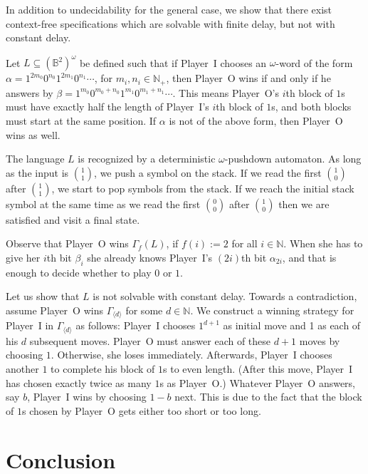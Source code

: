 \documentclass[fleqn,envcountsame]{LMCS}
\newcommand{\pI}{Player~I\xspace}
\newcommand{\pO}{Player~O\xspace}
\newcommand{\Gd}[1]{\ensuremath{\Gamma_{#1}}\xspace}
\newcommand{\GdL}[1]{\ensuremath{\Gamma_{#1}(L)}\xspace}
\newcommand{\const}[1]{\ensuremath{\langle#1\rangle}\xspace}
\newcommand{\Nat}{\ensuremath{\mathbb{N}}\xspace}
\newcommand{\Natp}{\ensuremath{\mathbb{N}_+}\xspace}
\newcommand{\Bsqom}{\ensuremath{(\mathbb{B}^2)^{\omega}}\xspace}
\newcommand{\al}{\ensuremath{\alpha}\xspace}
\newcommand{\be}{\ensuremath{\beta}\xspace}
\let\obinom\binom
\renewcommand\binom[2]{
  \Big( { {{#1}} \atop {{#2}} } \Big)
}
\begin{document}
In addition to undecidability for the general case, we show that there exist
context-free specifications which are solvable with finite delay,
but not with constant delay.

\begin{exa}\label{ex:non_regular_not_constant_delay}
Let $L\subseteq\Bsqom$ be defined such that if \pI chooses an $\omega$-word
of the form $\al=1^{2m_0}0^{n_0}1^{2m_1}0^{n_1}\cdots$, for $m_i,n_i\in\Natp$, then
\pO wins if and only if he answers by $\beta=1^{m_0}0^{m_0+n_0}1^{m_1}0^{m_1+n_1}\cdots$.
This means \pO's $i$th block of $1$s must have exactly half the length of
\pI's $i$th block of $1$s, and both blocks must start at the same position.
If \al is not of the above form, then \pO wins as well.

The language $L$ is recognized by a deterministic $\omega$-pushdown automaton.
As long as the input is $\obinom{1}{1}$, we push a symbol on the stack.
If we read the first $\obinom{1}{0}$ after $\obinom{1}{1}$,
we start to pop symbols from the stack. If we reach the initial stack
symbol at the same time as we read the first $\obinom{0}{0}$
after $\obinom{1}{0}$ then we are satisfied and visit a final state.

Observe that \pO wins \GdL{f}, if $f(i):=2$ for all $i\in\Nat$.
When she has to give her $i$th bit $\be_i$ she already knows \pI's $(2i)$th bit $\al_{2i}$,
and that is enough to decide whether to play $0$ or $1$.

Let us show that $L$ is not solvable with constant delay.
Towards a contradiction, assume \pO wins \Gd{\const{d}} for some $d\in\Nat$.
We construct a winning strategy for \pI in \Gd{\const{d}} as follows:
\pI chooses $1^{d+1}$ as initial move and 1 as each of his $d$ subsequent moves.
\pO must answer each of these $d+1$ moves by choosing $1$. Otherwise, she loses immediately.
Afterwards, \pI chooses another $1$ to complete his block of $1$s to even length.
(After this move, \pI has chosen exactly twice as many $1$s as \pO.)
Whatever \pO answers, say $b$, \pI wins by choosing $1-b$ next.
This is due to the fact that the block of $1$s chosen by \pO gets either
too short or too long. 
\end{exa}



\section{Conclusion}\label{sec:conclusion}
\end{document}
